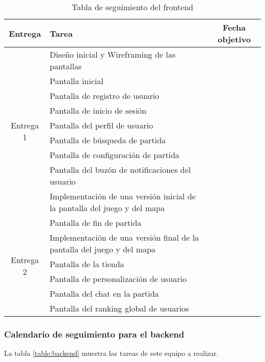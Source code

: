 \documentclass[11pt, a4paper, titlepage]{article}
\begin{document}
\renewcommand{\arraystretch}{1.3}
\begin{table}[hbt!]
\begin{adjustbox}{minipage=18cm, center}
\begin{tabularx}{\textwidth}{|c|X|c| }
\hline
Entrega & Tarea & Fecha objetivo\\ \hline
\multirow{9}{*}{Entrega 1} & Diseño inicial y Wireframing de las pantallas & \\\cline{2-3}
& Pantalla inicial & \\\cline{2-3}
& Pantalla de registro de usuario &   \\\cline{2-3}
& Pantalla de inicio de sesión &  \\\cline{2-3}
& Pantalla del perfil de usuario &  \\\cline{2-3}
& Pantalla de búsqueda de partida &  \\\cline{2-3}
& Pantalla de configuración de partida & \\\cline{2-3}
& Pantalla del buzón de notificaciones del usuario &  \\\cline{2-3}
& Implementación de una versión inicial de la pantalla del juego y del mapa & 
\\\hline
\multirow{6}{*}{Entrega 2} & Pantalla de fin de partida &  \\\cline{2-3}
& Implementación de una versión final de la pantalla del juego y del mapa &\\\cline{2-3}
& Pantalla de la tienda &  \\\cline{2-3}
& Pantalla de personalización de usuario & \\\cline{2-3}
& Pantalla del chat en la partida & \\\cline{2-3}
& Pantalla del ranking global de usuarios&  \\\cline{2-3}
\hline
\end{tabularx}
\caption{Tabla de seguimiento del frontend}
\label{table:frontend}
\end{adjustbox}
\end{table}
\FloatBarrier    

\newpage

\subsubsection{Calendario de seguimiento para el backend}
 La tabla \ref{table:backend} muestra las tareas de este equipo a realizar. \newline
\end{document}
